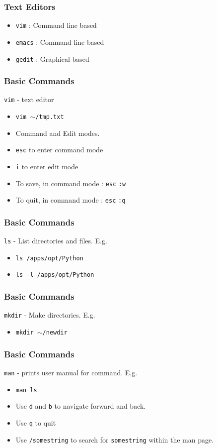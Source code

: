 \documentclass{beamer}
\newcommand{\code}[1]{\colorbox{codegray}{\texttt{#1}}}
\begin{document}
\begin{frame}
\frametitle{Text Editors}
\begin{itemize}
    \item \code{vim}   : Command line based
    \pause
    \bigskip
    \item \code{emacs} : Command line based
    \pause
    \bigskip
    \item \code{gedit} : Graphical  based
\end{itemize}
\end{frame}


\begin{frame}
\frametitle{Basic Commands}
\code{vim} - text editor
\bigskip
\begin{itemize}
    \item \code{vim $\sim$/tmp.txt}
    \bigskip
    \pause
    \item Command and Edit modes.
    \bigskip
    \pause
    \item \code{esc} to enter command mode
    \pause
    \bigskip
    \item \code{i} to enter edit mode
    \pause
    \bigskip
    \item To save, in command mode : \code{esc} \code{:w}
    \pause
    \bigskip
    \item To quit, in command mode : \code{esc} \code{:q}
\end{itemize}
\end{frame}


\begin{frame}
\frametitle{Basic Commands}
\code{ls} - List directories and files. E.g.
\bigskip
\begin{itemize}
    \item \code{ls /apps/opt/Python}
    \bigskip
    \pause
    \item \code{ls -l /apps/opt/Python} 
\end{itemize}
\end{frame}



\begin{frame}
\frametitle{Basic Commands}
\code{mkdir} - Make directories. E.g.
\bigskip
\begin{itemize}
    \item \code{mkdir $\sim$/newdir}
\end{itemize}
\end{frame}


\begin{frame}
\frametitle{Basic Commands}
\code{man} - prints user manual for command. E.g.
\bigskip
\begin{itemize}
    \item \code{man ls}
    \pause
    \bigskip
    \item Use \code{d} and \code{b} to navigate forward and back.
    \pause
    \bigskip
    \item Use \code{q} to quit
    \pause
    \bigskip
    \item Use \code{/somestring} to search for \code{somestring} within the man page.
\end{itemize}
\end{frame}
\end{document}
